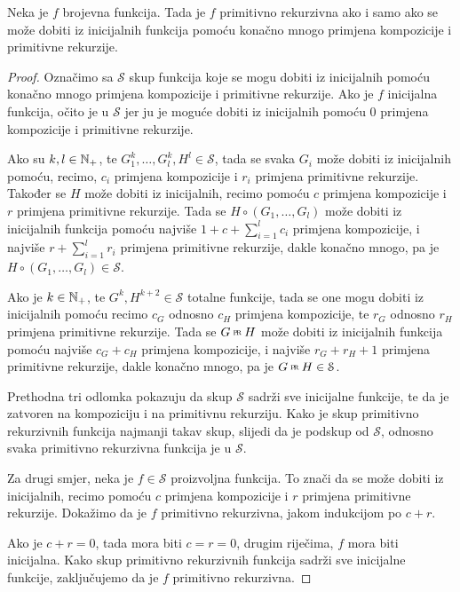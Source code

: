 \begin{propozicija}\label{prop:symbdef}
Neka je $f$ brojevna funkcija. Tada je $f$ primitivno rekurzivna ako i samo ako se može dobiti iz inicijalnih funkcija pomoću konačno mnogo primjena kompozicije i primitivne rekurzije.
\end{propozicija}
\begin{proof}
Označimo sa $\mathcal S$ skup funkcija koje se mogu dobiti iz inicijalnih pomoću ko\-nač\-no mnogo primjena kompozicije i primitivne rekurzije. Ako je $f$ inicijalna funkcija, očito je u $\mathcal S$ jer ju je moguće dobiti iz inicijalnih pomoću $0$ primjena kompozicije i primitivne rekurzije.

Ako su $k,l\in{\mathbb N}_+$, te $G_1^k,\dotsc,G_l^k,H^l\in\mathcal S$, tada se svaka $G_i$ može dobiti iz inicijalnih pomoću, recimo, $c_i$ primjena kompozicije i $r_i$ primjena primitivne rekurzije. Također se $H$ može dobiti iz inicijalnih, recimo pomoću $c$ primjena kompozicije i $r$ primjena primitivne rekurzije. Tada se $H\circ(G_1,\dotsc,G_l)$ može dobiti iz inicijalnih funkcija pomoću najviše $1+c+\sum_{i=1}^lc_i$ primjena kompozicije, i najviše $r+\sum_{i=1}^lr_i$ primjena primitivne rekurzije, dakle konačno mnogo, pa je $H\circ(G_1,\dotsc,G_l)\in\mathcal S$.

Ako je $k\in{\mathbb N}_+$, te $G^k,H^{k+2}\in\mathcal S$ totalne funkcije, tada se one mogu dobiti iz inicijalnih pomoću recimo $c_G$ odnosno $c_H$ primjena kompozicije, te $r_G$ odnosno $r_H$ primjena primitivne rekurzije. Tada se $G\pr H$ može dobiti iz inicijalnih funkcija pomoću najviše $c_G+c_H$ primjena kompozicije, i najviše $r_G+r_H+1$ primjena primitivne rekurzije, dakle konačno mnogo, pa je $G\pr H\in\mathcal S$.

Prethodna tri odlomka pokazuju da skup $\mathcal S$ sadrži sve inicijalne funkcije, te da je zatvoren na kompoziciju i na primitivnu rekurziju. Kako je skup primitivno rekurzivnih funkcija najmanji takav skup, slijedi da je podskup od $\mathcal S$, odnosno svaka primitivno rekurzivna funkcija je u $\mathcal S$.

Za drugi smjer, neka je $f\in\mathcal S$ proizvoljna funkcija. To znači da se može dobiti iz inicijalnih, recimo pomoću $c$ primjena kompozicije i $r$ primjena primitivne rekurzije. Dokažimo da je $f$ primitivno rekurzivna, jakom indukcijom po $c+r$.

Ako je $c+r=0$, tada mora biti $c=r=0$, drugim riječima, $f$ mora biti inicijalna. Kako skup primitivno rekurzivnih funkcija sadrži sve inicijalne funkcije, zaključujemo da je $f$ primitivno rekurzivna.


\end{proof}
